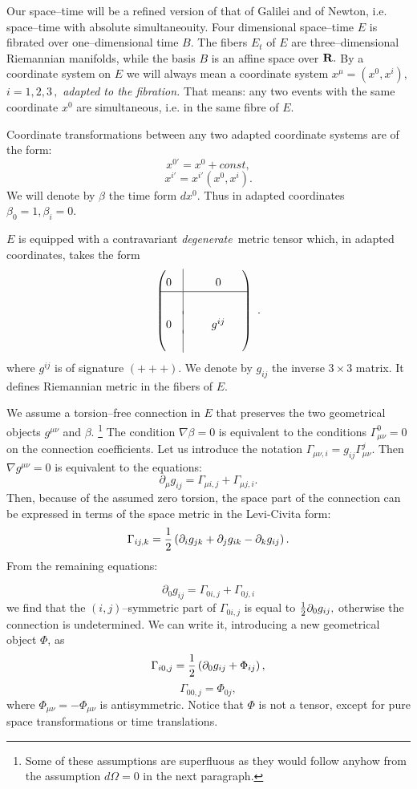 \documentclass[12pt]{article}
\def\be{\begin{equation}} \def\ee{\end{equation}}
\begin{document}
Our space--time will be a refined version of that of Galilei and
of Newton,  i.e.  space--time with absolute simultaneouity. 
Four dimensional space--time $E$ is fibrated over one--dimensional
time $B . $ The fibers $E_t$ of $E$ are three--dimensional
Riemannian manifolds,  while the basis $B$ is an affine space over
${\bf R} . $ By a coordinate system on $E$ we will always mean a
coordinate system $x^\mu= (x^0, x^i) , $ $i=1, 2, 3\,  , $ {\em adapted
to the
fibration.}  That means: any two events with the same coordinate $x^0$ are
simultaneous,  i.e.  in the same fibre of $E . $

Coordinate transformations between any two adapted coordinate systems
are of the form: 
$$
x^{0'}=x^0+const , 
$$
$$
x^{i'}=x^{i'}\left (x^0, x^{i}\right) . 
$$
We will denote by $\beta$ the time form $dx^0 . $ Thus in adapted
coordinates $\beta_0=1, \beta_i=0$. 

$E$ is equipped with a contravariant {\em degenerate}\, metric tensor which,
in adapted coordinates, takes the form
\def\linie{\vrule height 15pt depth 5pt}
\def\back{\noalign{\vskip-3pt}}
$$\begin{pmatrix}0 &\linie & \phantom{0 }& 0 &\phantom{0}\cr
\noalign{\hrule}
&\linie && \cr\back
0 &\linie &  & g^{ij} & 
\cr\back
& \linie && 
\end{pmatrix} \ . $$
where $g^{ij}$ is of signature $ (+++) . $ We denote by $g_{ij}$ the
inverse $3\times 3$ matrix.  It defines Riemannian metric in the
fibers of $E . $

We assume a torsion--free connection in $E$ that preserves
the two geometrical objects $g^{\mu\nu}$ and $\beta$.%
\footnote{Some of these assumptions are superfluous
as they would
follow anyhow from the assumption $d\Omega=0$ in the next
paragraph. }
The condition $\nabla\beta =0$ is equivalent to the conditions 
$\Gamma^0_{\mu\nu}=0$ on the connection coefficients.  Let us
introduce the notation $\Gamma_{\mu\nu, i}=g_{ij}\Gamma^j_{\mu\nu}. $
Then $\nabla g^{\mu\nu}=0$ is equivalent to the equations: 
\be
\partial_\mu g_{ij}=\Gamma_{\mu i, j}+\Gamma_{\mu j, i} . 
\ee
Then,  because of the assumed zero torsion,  the space part of the
connection can be expressed in terms of the space metric in
the Levi-Civita form:
\be
\Gamma_{ij, k}={1\over2}\left ( \partial_i g_{jk}+
\partial_j g_{ik}-
\partial_k g_{ij}\right) . 
\ee
From the remaining equations:

\be
\partial_0 g_{ij}= \Gamma_{0i, j} + \Gamma_{0j, i} 
\ee
we find that the  $(i,j)$--symmetric part of $\Gamma_{0i, j}$ is equal to
${1\over2}\partial_0 g_{ij} , $ otherwise the connection is
undetermined.  We can write it, introducing a new
geometrical object $\Phi$, as
\be
\Gamma_{i0, j}={1\over2}\left (\partial_0 g_{ij}+\Phi_{ij}\right) , 
\ee
\be
\Gamma_{00, j}=\Phi_{0j} , 
\ee
where $\Phi_{\mu\nu}=-\Phi_{\mu\nu}$ is antisymmetric. Notice
that $\Phi$ is not a tensor, except for pure space transformations
or time translations.
\end{document}
